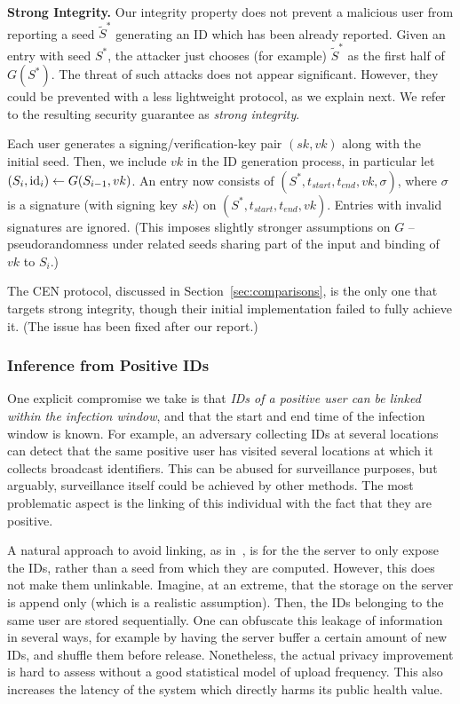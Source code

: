 \documentclass{article}
\begin{document}
{\bf Strong Integrity.} Our integrity property does not prevent a malicious user from reporting a seed $\widetilde{S}^*$ generating an ID which has been already reported. Given an entry with seed $S^*$, the attacker just chooses (for example) $\widetilde{S}^*$ as the first half of $G(S^*)$. The threat of such attacks does not appear significant. However, they could be prevented with a less lightweight protocol, as we explain next. We refer to the resulting security guarantee as {\em strong integrity}. 

Each user generates a signing/verification-key pair $(sk, vk)$ along with the initial seed. Then, we include $vk$ in the ID generation process, in particular let $(S_i, \mathrm{id}_i) \gets G(S_{i-1}, vk)$. An entry now consists of $(S^*, t_{start}, t_{end}, vk, \sigma)$, where $\sigma$ is a signature (with signing key $sk$) on $(S^*, t_{start}, t_{end}, vk)$. Entries with invalid signatures are ignored. (This imposes slightly stronger assumptions on $G$ -- pseudorandomness under related seeds sharing part of the input and binding of $vk$ to $S_i$.)

The CEN protocol, discussed in Section~\ref{sec:comparisons}, is the only one that targets strong integrity, though their initial implementation failed to fully achieve it. (The issue has been fixed after our report.)

\subsubsection{Inference from Positive IDs} 

One explicit compromise we take is that {\em IDs of a positive user can be linked within the infection window}, and that the start and end time of the infection window is known. For example, an adversary collecting IDs at several locations can detect that the same positive user has visited several locations at which it collects broadcast identifiers. This can be abused for surveillance purposes, but arguably, surveillance itself could be achieved by other methods. The most problematic aspect is the linking of this individual with the fact that they are positive. 

A natural approach to avoid linking, as in~\cite{BU}, is for the the server to only expose the IDs, rather than a seed from which they are computed. However, this does not make them unlinkable. Imagine, at an extreme, that the storage on the server is append only (which is a realistic assumption). Then, the IDs belonging to the same user are stored sequentially. One can obfuscate this leakage of information in several ways, for example by having the server buffer a certain amount of new IDs, and shuffle them before release. Nonetheless, the actual privacy improvement is hard to assess without a good statistical model of upload frequency. This also increases the latency of the system which directly harms its public health value.
\end{document}
